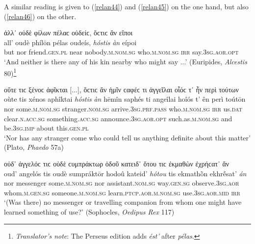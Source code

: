 A similar reading is given to (\ref{relan44}) and (\ref{relan45}) on the one hand, but also (\ref{relan46}) on the other.

\begin{exe}
\ex ἀλλ᾽ οὐδὲ φίλων πέλαϲ οὐδείϲ, ὅϲτιϲ ἂν εἴποι\\
\gll all' oudè phílōn pélas oudeís, \emph{hóstis} \emph{àn} eípoi\\
but nor friend.\textsc{gen.pl} near nobody.\textsc{m.nom.sg} who.\textsc{m.nom.sg} \textsc{irr} say.\textsc{3sg.aor.opt}\\
\trans `And neither is there any of his kin nearby who might say ...' (Euripides, \textit{Alcestis} 80)\footnote{\emph{Translator's note}: The Perseus edition adds \textit{ést'} after \textit{pélas}.}
\label{relan44}
\end{exe}

\begin{exe}
\ex οὔτε τιϲ ξένοϲ ἀφῖκται {[}...{]}, ὅϲτιϲ ἂν ἡμῖν ϲαφέϲ τι ἀγγεῖλαι οἷόϲ τ᾽ ἦν περὶ τούτων\\
\gll oùte tis xénos aphîktai \emph{hóstis} \emph{àn} hēmîn saphés ti angeîlai hoîós t' ên perì toútōn\\
nor some.\textsc{m.nom.sg} stranger.\textsc{nom.sg} arrive.\textsc{3sg.prf.pass} who.\textsc{m.nom.sg} \textsc{irr} us.\textsc{dat} clear.\textsc{n.acc.sg} something.\textsc{acc.sg} announce.\textsc{3sg.aor.opt} such.as.\textsc{m.nom.sg} and be.\textsc{3sg.imp} about this.\textsc{gen.pl}\\
\trans `Nor has any stranger come who could tell us anything definite about this matter' (Plato, \textit{Phaedo} 57a)
\label{relan45}
\end{exe}

\begin{exe}
\ex οὐδ᾽ ἀγγελόϲ τιϲ οὐδὲ ϲυμπράκτωρ ὁδοῦ κατειδ᾽ ὅτου τιϲ ἐκμαθὼν ἐχρήϲατ᾽ ἄν\\
\gll oud' angelós tis oudè sumpráktōr hodoû kateid' \emph{hótou} tis ekmathṑn ekhrḗsat' \emph{án}\\
nor messenger some.\textsc{m.nom.sg} nor assistant.\textsc{nom.sg} way.\textsc{gen.sg} observe.\textsc{3sg.aor} whom.\textsc{m.gen.sg} someone.\textsc{m.nom.sg} learn.\textsc{ptcp.aor.m.nom.sg} use.\textsc{3sg.aor.mid} \textsc{irr}\\
\trans `(Was there) no messenger or travelling companion from whom one might have learned something of use?' (Sophocles, \textit{Oedipus Rex} 117)
\label{relan46}
\end{exe}

